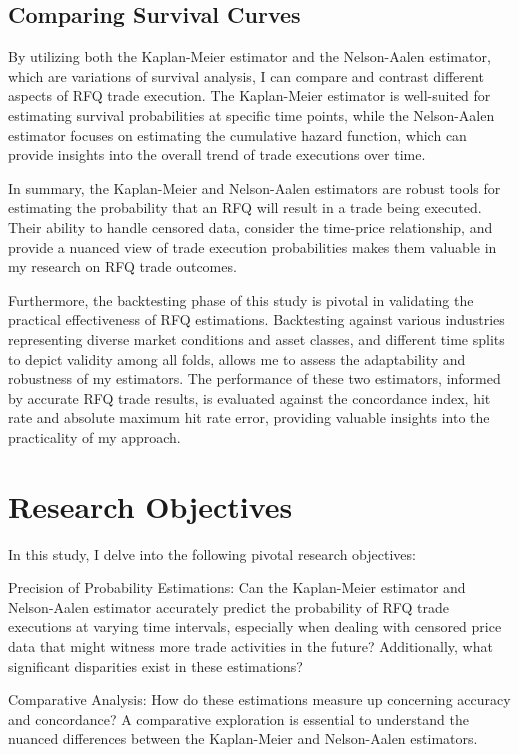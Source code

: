 \subsection{Comparing Survival Curves}
By utilizing both the Kaplan-Meier estimator and the Nelson-Aalen estimator, which are variations of survival analysis, I can compare and contrast different aspects of RFQ trade execution. The Kaplan-Meier estimator is well-suited for estimating survival probabilities at specific time points, while the Nelson-Aalen estimator focuses on estimating the cumulative hazard function, which can provide insights into the overall trend of trade executions over time.

In summary, the Kaplan-Meier and Nelson-Aalen estimators are robust tools for estimating the probability that an RFQ will result in a trade being executed. Their ability to handle censored data, consider the time-price relationship, and provide a nuanced view of trade execution probabilities makes them valuable in my research on RFQ trade outcomes.

Furthermore, the backtesting phase of this study is pivotal in validating the practical effectiveness of RFQ estimations. Backtesting against various industries representing diverse market conditions and asset classes, and different time splits to depict validity among all folds, allows me to assess the adaptability and robustness of my estimators. The performance of these two estimators, informed by accurate RFQ trade results, is evaluated against the concordance index, hit rate and absolute maximum hit rate error, providing valuable insights into the practicality of my approach.

\section{Research Objectives}
In this study, I delve into the following pivotal research objectives:

Precision of Probability Estimations: Can the Kaplan-Meier estimator and Nelson-Aalen estimator accurately predict the probability of RFQ trade executions at varying time intervals, especially when dealing with censored price data that might witness more trade activities in the future? Additionally, what significant disparities exist in these estimations?

Comparative Analysis: How do these estimations measure up concerning accuracy and concordance? A comparative exploration is essential to understand the nuanced differences between the Kaplan-Meier and Nelson-Aalen estimators.

